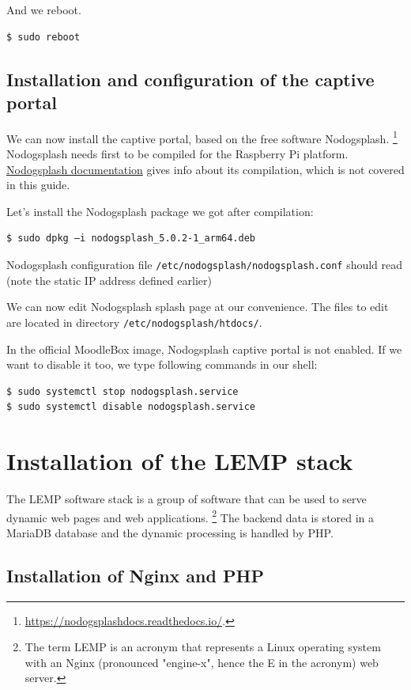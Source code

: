 \documentclass[12pt]{article}
\begin{document}
And we reboot.
\begin{lstlisting}[language=bash]
$ sudo reboot
\end{lstlisting}

\subsection{Installation and configuration of the captive portal}

We can now install the captive portal, based on the free software Nodogsplash.%
\footnote{\url{https://nodogsplashdocs.readthedocs.io/}.}
Nodogsplash needs first to be compiled for the Raspberry Pi platform.
\href{https://nodogsplashdocs.readthedocs.io/en/stable/compile.html}{Nodogsplash documentation} gives info about its compilation, which is not covered in this guide.

Let's install the Nodogsplash package we got after compilation:
\begin{lstlisting}[language=bash]
$ sudo dpkg –i nodogsplash_5.0.2-1_arm64.deb
\end{lstlisting}
Nodogsplash configuration file \lstinline{/etc/nodogsplash/nodogsplash.conf} should read (note the static IP address defined earlier)


We can now edit Nodogsplash splash page at our convenience.
The files to edit are located in directory \lstinline{/etc/nodogsplash/htdocs/}.

In the official MoodleBox image, Nodogsplash captive portal is not enabled.
If we want to disable it too, we type following commands in our shell:
\begin{lstlisting}[language=bash]
$ sudo systemctl stop nodogsplash.service
$ sudo systemctl disable nodogsplash.service
\end{lstlisting}

\section{Installation of the LEMP stack}

The LEMP software stack is a group of software that can be used to serve dynamic web pages and web applications.%
\footnote{The term LEMP is an acronym that represents a Linux operating system with an Nginx (pronounced "engine-x", hence the E in the acronym) web server.}
The backend data is stored in a MariaDB database and the dynamic processing is handled by PHP.

\subsection{Installation of Nginx and PHP}\label{ssec-lemp}
\end{document}
